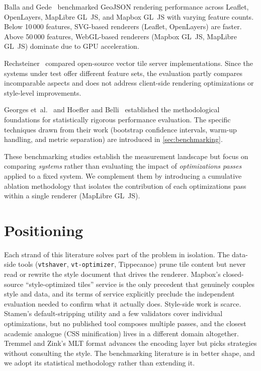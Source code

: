 Balla and Gede~\cite{ballaVectorDataRendering2025} benchmarked \ac{GeoJSON} rendering performance across Leaflet, OpenLayers, MapLibre GL~JS, and Mapbox GL~JS with varying feature counts.
Below 10\,000 features, \ac{SVG}-based renderers (Leaflet, OpenLayers) are faster.
Above 50\,000 features, \ac{WebGL}-based renderers (Mapbox GL~JS, MapLibre GL~JS) dominate due to \ac{GPU} acceleration.

\begin{sloppypar}
Rechsteiner~\cite{rechsteinerPerformancevergleichOpenSourceVectorTilesServerloesungenZur2024} compared open-source vector tile server implementations.
Since the systems under test offer different feature sets, the evaluation partly compares incomparable aspects and does not address client-side rendering optimizations or style-level improvements.
\end{sloppypar}

Georges et~al.~\cite{georgesStatisticallyRigorousJava2007} and Hoefler and Belli~\cite{hoeflerScientificBenchmarkingParallel2015} established the methodological foundations for statistically rigorous performance evaluation.
The specific techniques drawn from their work (bootstrap confidence intervals, warm-up handling, and metric separation) are introduced in \cref{sec:benchmarking}.

These benchmarking studies establish the measurement landscape but focus on comparing \emph{systems} rather than evaluating the impact of \emph{optimizations passes} applied to a fixed system.
We complement them by introducing a cumulative ablation methodology that isolates the contribution of each optimizations pass within a single renderer (MapLibre GL~JS).

\section{Positioning}\label{sec:rw_positioning}

Each strand of this literature solves part of the problem in isolation.
The data-side tools (\texttt{vtshaver}, \texttt{vt-optimizer}, Tippecanoe) prune tile content but never read or rewrite the style document that drives the renderer.
Mapbox's closed-source \enquote{style-optimized tiles} service is the only precedent that genuinely couples style and data, and its terms of service explicitly preclude the independent evaluation needed to confirm what it actually does.
Style-side work is scarce.
Stamen's default-stripping utility and a few validators cover individual optimizations, but no published tool composes multiple passes, and the closest academic analogue (\ac{CSS} minification) lives in a different domain altogether.
Tremmel and Zink's \ac{MLT} format advances the encoding layer but picks strategies without consulting the style.
The benchmarking literature is in better shape, and we adopt its statistical methodology rather than extending it.

